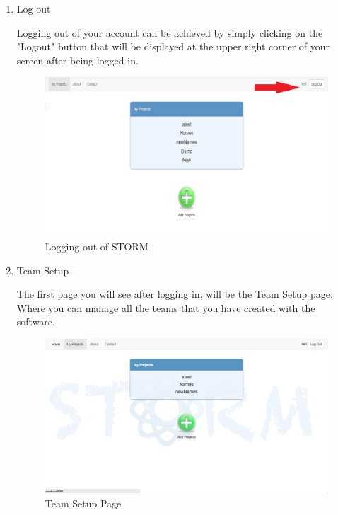 \begin{enumerate}
\item Log out\par
Logging out of your account can be achieved by simply clicking on the "Logout" button that will be displayed at the upper right corner of your screen after being logged in.
 \begin{figure}[H] 
	\centering
	\includegraphics[width=13cm]{./graphics/Logout.jpg}\par
	\caption{Logging out of STORM}
\end{figure}

\item Team Setup\par
The first page you will see after logging in, will be the Team Setup page.  Where you can manage all the teams that you have created with the software.\par
 \begin{figure}[H] 
	\centering
	\includegraphics[width=13cm]{./graphics/TeamSetup.jpg}\par
	\caption{Team Setup Page}
\end{figure}


\end{enumerate}
